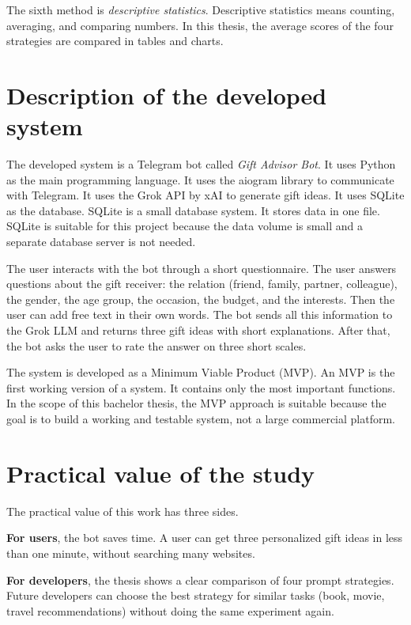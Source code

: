 The sixth method is \textit{descriptive statistics}. Descriptive statistics means counting, averaging, and comparing numbers. In this thesis, the average scores of the four strategies are compared in tables and charts.

\section*{Description of the developed system}

The developed system is a Telegram bot called \textit{Gift Advisor Bot}. It uses Python as the main programming language. It uses the aiogram library to communicate with Telegram. It uses the Grok API by xAI to generate gift ideas. It uses SQLite as the database. SQLite is a small database system. It stores data in one file. SQLite is suitable for this project because the data volume is small and a separate database server is not needed.

The user interacts with the bot through a short questionnaire. The user answers questions about the gift receiver: the relation (friend, family, partner, colleague), the gender, the age group, the occasion, the budget, and the interests. Then the user can add free text in their own words. The bot sends all this information to the Grok LLM and returns three gift ideas with short explanations. After that, the bot asks the user to rate the answer on three short scales.

The system is developed as a Minimum Viable Product (MVP). An MVP is the first working version of a system. It contains only the most important functions. In the scope of this bachelor thesis, the MVP approach is suitable because the goal is to build a working and testable system, not a large commercial platform.

\section*{Practical value of the study}

The practical value of this work has three sides.

\textbf{For users}, the bot saves time. A user can get three personalized gift ideas in less than one minute, without searching many websites.

\textbf{For developers}, the thesis shows a clear comparison of four prompt strategies. Future developers can choose the best strategy for similar tasks (book, movie, travel recommendations) without doing the same experiment again.

